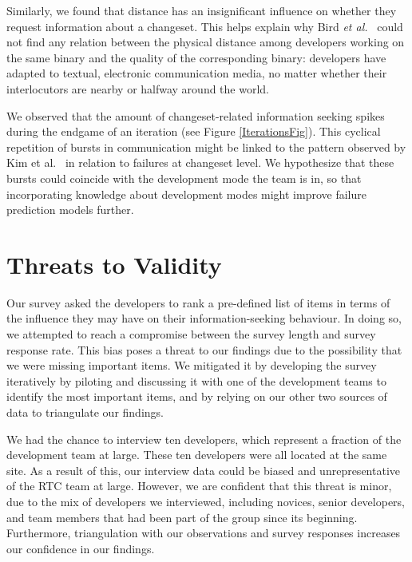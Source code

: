 \documentclass{sig-alternate}
\begin{document}
Similarly, we found that distance has an insignificant influence on whether they request information about a changeset. This helps explain why Bird \emph{et al.}~\cite{bird:icse:2009} could not find any relation between the physical distance among developers working on the same binary and the quality of the corresponding binary: developers have adapted to textual, electronic communication media, no matter whether their interlocutors are nearby or halfway around the world.

We observed that the amount of changeset-related information seeking spikes during the endgame of an iteration (see Figure \ref{IterationsFig}). This cyclical repetition of bursts in communication might be linked to the pattern observed by Kim et al.~\cite{kim:icse:2007} in relation to failures at changeset level. We hypothesize that these bursts could coincide with the development mode the team is in, so that incorporating knowledge about development modes might improve failure prediction models further.


\section{Threats to Validity}
\label{sec:threats}

Our survey asked the developers to rank a pre-defined list of items in
terms of the influence they may have on their information-seeking behaviour.
In doing so, we attempted to reach a compromise between the survey length and
survey response rate. 
This bias poses a threat to our findings due to the possibility that we were missing important items.
We mitigated it by developing the survey iteratively by piloting and discussing it with one of the development teams to identify the most important items, and by relying on our other two sources of data to triangulate our findings.



We had the chance to interview ten developers, which represent a fraction of the development team at large. These ten developers were all located at the same site. As a result of this, our interview data could be biased and unrepresentative of the RTC team at large.
However, we are confident that this threat is minor, due to the mix of developers we interviewed, including novices, senior developers, and team members that had been part of the group since its beginning.
Furthermore, triangulation with our observations and survey responses increases our confidence in our findings.
\end{document}
